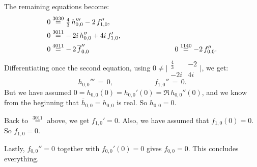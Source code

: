\documentclass[12pt,twoside,leqno,openany]{amsart}
\begin{document}
The remaining equations become:
\[
\aligned
0
&
\overset{3030}{\,\,=\,\,}
\tfrac{4}{3}\,
h_{0,0}'''
-
2\,f_{1,0}'',
&
\ \ \ \ \ \ \ \ \ \ \ \ \ \ \ \ \ \ \ \
&
\\
0
&
\overset{3011}{\,\,=\,\,}
-\,2i\,h_{0,0}''
+
4i\,f_{1,0}',
&
\ \ \ \ \ \ \ \ \ \ \ \ \ \ \ \ \ \ \ \
&
\\
0
&
\overset{4011}{\,\,=\,\,}
-\,2\,\overline{f}_{0,0}''
&
\ \ \ \ \ \ \ \ \ \ \ \ \ \ \ \ \ \ \ \
0
&
\overset{1140}{\,\,=\,\,}
-2\,f_{0,0}''.
\endaligned
\]
Differentiating once the second equation, using
$0 \neq \big\vert \begin{smallmatrix} \frac{4}{3} & -2 \\ -2i & 4i 
\end{smallmatrix} \big\vert$, we get:
\[
h_{0,0}'''
\,=\,0,
\ \ \ \ \ \ \ \ \ \ \ \ \ \ \ \ \ \ \ \ \ \ \ \ \ \
f_{1,0}''
\,=\,
0.
\]
But we have assumed $0 = h_{0,0}(0) = h_{0,0}'(0) = 
\Re\, h_{0,0}''(0)$, and we know from the beginning
that $\overline{h}_{0,0} = h_{0,0}$ is real.
So $h_{0,0} = 0$.

Back to $\overset{3011}{\,\,=\,\,}$ above, we get $f_{1,0}' = 0$.
Also, we have assumed that $f_{1,0}(0) = 0$. So
$f_{1,0} = 0$. 

Lastly, $f_{0,0}'' = 0$ together with $f_{0,0}'(0) = 0$ 
gives $f_{0,0} = 0$.
This concludes everything.
\endproof





\vfill
\end{document}

